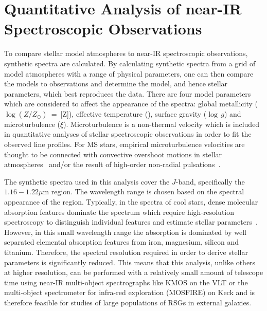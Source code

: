 

\section{Quantitative Analysis of near-IR Spectroscopic Observations} %
\label{sec:model_grid}

To compare stellar model atmospheres to near-IR spectroscopic observations, synthetic spectra are calculated.
By calculating synthetic spectra from a grid of model atmospheres with a range of physical parameters, one can then compare the models to observations and determine the model, and hence stellar parameters, which best reproduces the data.
There are four model parameters which are considered to affect the appearance of the spectra:
global metallicity ($\log (Z/Z_{\odot})$~=~[Z]), effective temperature (\Teff), surface gravity ($\log\,g$) and microturbulence ($\xi$).
Microturbulence is a non-thermal velocity which is included in quantitative analyses of stellar spectroscopic observations in order to fit the observed line profiles.
For MS stars, empirical microturbulence velocities are thought to be connected with convective overshoot motions in stellar atmospheres~\citep{2009A&A...499..279C} and/or the result of high-order non-radial pulsations~\cite[e.g.][]{2015ApJ...806L..33A}.


The synthetic spectra used in this analysis cover the $J$-band, specifically the $1.16-1.22\mu$m region.
The wavelength range is chosen based on the spectral appearance of the region.
Typically, in the spectra of cool stars, dense molecular absorption features dominate the spectrum which require high-resolution spectroscopy to distinguish individual features and estimate stellar parameters~\citep{Cunha07, Davies09a, Davies09b}.
However, in this small wavelength range the absorption is dominated by well separated elemental absorption features from iron, magnesium, silicon and titanium.
Therefore, the spectral resolution required in order to derive stellar parameters is significantly reduced.
This means that this analysis, unlike others at higher resolution, can be performed with a relatively small amount of telescope time using near-IR multi-object spectrographs like KMOS on the VLT
or the multi-object spectrometer for infra-red exploration (MOSFIRE) on Keck and is therefore feasible for studies of large populations of RSGs in external galaxies.

